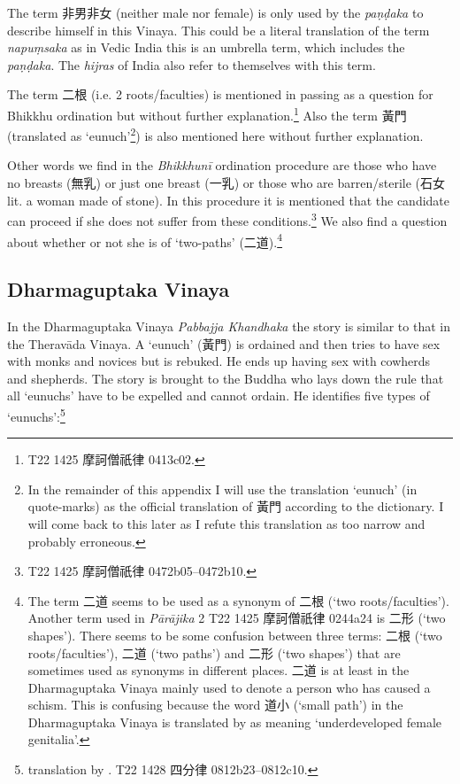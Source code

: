 The term 非男非女 (neither male nor female) is only used by the {\em paṇḍaka} to describe himself in this Vinaya. This could be a literal translation of the term {\em napuṃsaka} as in Vedic India this is an umbrella term, which includes the {\em paṇḍaka}. The {\em hijras} of India also refer to themselves with this term.

The term 二根 (i.e. 2 roots/faculties) is mentioned in passing as a question for Bhikkhu ordination but without further explanation.\footnote{T22 1425 摩訶僧祇律 0413c02.} Also the term 黃門 (translated as `eunuch'\footnote{In the remainder of this appendix I will use the translation `eunuch' (in quote-marks) as the official translation of 黃門 according to the dictionary. I will come back to this later as I refute this translation as too narrow and probably erroneous.}) is also mentioned here without further explanation.

Other words we find in the {\em Bhikkhunī} ordination procedure are those who have no breasts (無乳) or just one breast (一乳) or those who are barren/sterile (石女 lit. a woman made of stone). In this procedure it is mentioned that the candidate can proceed if she does not suffer from these conditions.\footnote{T22 1425 摩訶僧祇律 0472b05–0472b10.} We also find a question about whether or not she is of `two-paths’ (二道).\footnote{The term 二道 seems to be used as a synonym of 二根 (`two roots/faculties'). Another term used in {\em Pārājika} 2 T22 1425 摩訶僧祇律 0244a24 is 二形 (`two shapes'). There seems to be some confusion between three terms: 二根 (`two roots/faculties'), 二道 (`two paths') and 二形 (`two shapes') that are sometimes used as synonyms in different places. 二道 is at least in the Dharmaguptaka Vinaya mainly used to denote a person who has caused a schism. This is confusing because the word 道小 (`small path') in the Dharmaguptaka Vinaya is translated by \cite{bodhi} as meaning `underdeveloped female genitalia'.}

\subsection{Dharmaguptaka Vinaya}
In the Dharmaguptaka Vinaya {\em Pabbajja Khandhaka} the story is similar to that in the Theravāda Vinaya. A `eunuch' (黃門) is ordained and then tries to have sex with monks and novices but is rebuked. He ends up having sex with cowherds and shepherds. The story is brought to the Buddha who lays down the rule that all `eunuchs' have to be expelled and cannot ordain. He identifies five types of `eunuchs':\footnote{translation by \cite{bodhi}. T22 1428 四分律 0812b23–0812c10.} 

